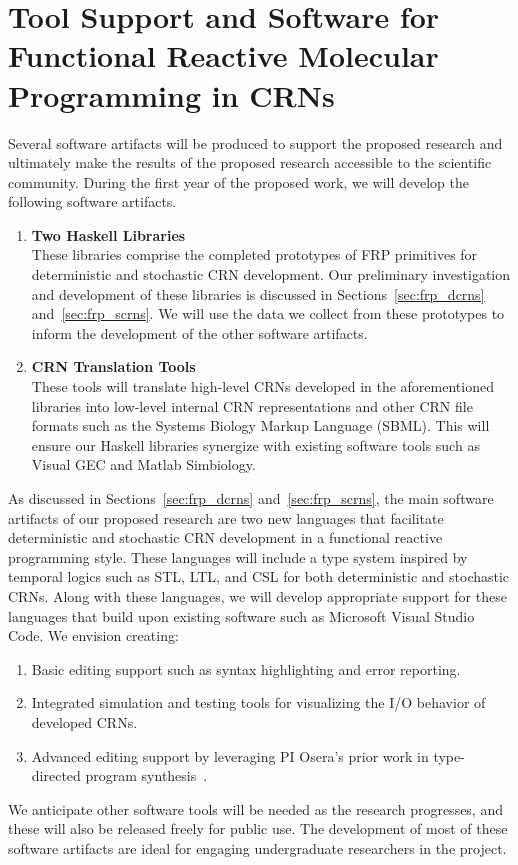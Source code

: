 
\section{Tool Support and Software for Functional Reactive Molecular Programming in CRNs}
\label{sec:software_support}

Several software artifacts will be produced to support the proposed research and ultimately make the results of the proposed research accessible to the scientific community.
During the first year of the proposed work, we will develop the following software artifacts.
\begin{enumerate}
	\item \textbf{Two Haskell Libraries}\\
    These libraries comprise the completed prototypes of FRP primitives for deterministic and stochastic CRN development.
	Our preliminary investigation and development of these libraries is discussed in Sections~\ref{sec:frp_dcrns} and~\ref{sec:frp_scrns}.
	We will use the data we collect from these prototypes to inform the development of the other software artifacts.
	
	\item \textbf{CRN Translation Tools}\\
    These tools will translate high-level CRNs developed in the aforementioned libraries into low-level internal CRN representations and other CRN file formats such as the Systems Biology Markup Language (SBML).
	This will ensure our Haskell libraries synergize with existing software tools such as Visual GEC and Matlab Simbiology.
\end{enumerate}

As discussed in Sections~\ref{sec:frp_dcrns} and~\ref{sec:frp_scrns}, the main software artifacts of our proposed research are two new languages that facilitate deterministic and stochastic CRN development in a functional reactive programming style.
These languages will include a type system inspired by temporal logics such as STL, LTL, and CSL for both deterministic and stochastic CRNs.
Along with these languages, we will develop appropriate support for these languages that build upon existing software such as Microsoft Visual Studio Code.
We envision creating:
\begin{enumerate}
	\item Basic editing support such as syntax highlighting and error reporting.
	\item Integrated simulation and testing tools for visualizing the I/O behavior of developed CRNs.
  \item Advanced editing support by leveraging PI Osera's prior work in type-directed program synthesis~\cite{osera:thesis:2015, osera:pldi:2015, frankle:popl:2015, osera:tyde:2019}.
\end{enumerate}

We anticipate other software tools will be needed as the research progresses, and these will also be released freely for public use.
The development of most of these software artifacts are ideal for engaging undergraduate researchers in the project.
